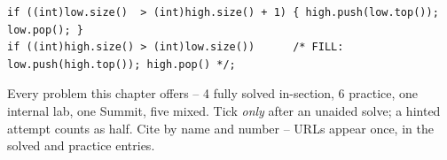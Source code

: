 \begin{lstlisting}[caption={Drill 5 -- two-heap median rebalance (from \coderef{c07-median})}]
if ((int)low.size()  > (int)high.size() + 1) { high.push(low.top()); low.pop(); }
if ((int)high.size() > (int)low.size())      /* FILL: low.push(high.top()); high.pop() */;
\end{lstlisting}


Every problem this chapter offers -- 4 fully solved in-section, 6 practice, one internal lab, one Summit,
five mixed. Tick \emph{only} after an unaided solve; a hinted attempt counts as half. Cite by name and
number -- URLs appear once, in the solved and practice entries.

